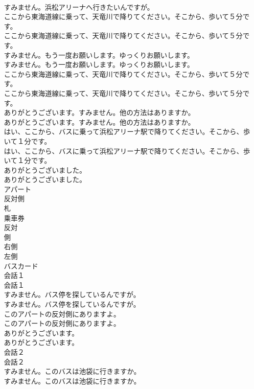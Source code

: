 \documentclass[8pt]{extreport}
\begin{document}
\begin{CJK}{UTF8}{min}
\\	すみません。浜松アリーナへ行きたいんですが。 
\\	ここから東海道線に乗って、天竜川で降りてください。そこから、歩いて５分です。	
\\	ここから東海道線に乗って、天竜川で降りてください。そこから、歩いて５分です。 
\\	すみません。もう一度お願いします。ゆっくりお願いします。	
\\	すみません。もう一度お願いします。ゆっくりお願いします。 
\\	ここから東海道線に乗って、天竜川で降りてください。そこから、歩いて５分です。	
\\	ここから東海道線に乗って、天竜川で降りてください。そこから、歩いて５分です。 
\\	ありがとうございます。すみません。他の方法はありますか。	
\\	ありがとうございます。すみません。他の方法はありますか。 
\\	はい、ここから、バスに乗って浜松アリーナ駅で降りてください。そこから、歩いて１分です。	
\\	はい、ここから、バスに乗って浜松アリーナ駅で降りてください。そこから、歩いて１分です。 
\\	ありがとうございました。	
\\	ありがとうございました。 
\\	アパート
\\	反対側
\\	札
\\	乗車券
\\	反対
\\	側
\\	右側
\\	左側
\\	バスカード
\\	会話１	
\\	会話１ 
\\	すみません。バス停を探しているんですが。	
\\	すみません。バス停を探しているんですが。 
\\	このアパートの反対側にありますよ。	
\\	このアパートの反対側にありますよ。 
\\	ありがとうございます。	
\\	ありがとうございます。 
\\	会話２	
\\	会話２ 
\\	すみません。このバスは池袋に行きますか。	
\\	すみません。このバスは池袋に行きますか。 

\end{CJK}
\end{document}
